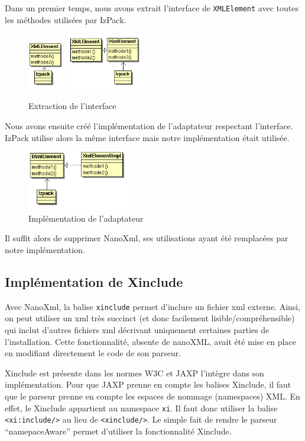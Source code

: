 Dans un premier temps, nous avons extrait l'interface de \verb|XMLElement| avec toutes les méthodes utilisées par IzPack.
\begin{figure}[H]
	\centering
	\includegraphics[width=0.15\textwidth]{../image/sol_casInitial.png}
	\hfil
	\includegraphics[width=0.3\textwidth]{../image/sol_extractionInterface.png}
	\caption{Extraction de l'interface}
\end{figure}
Nous avons ensuite créé l'implémentation de l'adaptateur respectant l'interface.
IzPack utilise alors la même interface mais notre implémentation était utilisée.
\begin{figure}[H]
	\centering
	\includegraphics[width=0.4\textwidth]{../image/sol_implementation.png}
	\caption{Implémentation de l'adaptateur}
\end{figure}
Il suffit alors de supprimer NanoXml, ses utilisations ayant été remplacées par notre implémentation.
\subsection{Implémentation de Xinclude}
Avec NanoXml, la balise \verb|xinclude| permet d'inclure un fichier xml externe.
Ainsi, on peut utiliser un xml très succinct (et donc facilement lisible/compréhensible) qui inclut d'autres fichiers xml décrivant uniquement certaines parties de l'installation.
Cette fonctionnalité, absente de nanoXML, avait été mise en place en modifiant directement le code de son parseur.

Xinclude est présente dans les normes W3C et JAXP l'intègre dans son implémentation.
Pour que JAXP prenne en compte les balises Xinclude, il faut que le parseur prenne en compte les espaces de nommage (namespaces) XML.
En effet, le Xinclude appartient au namespace \verb|xi|.
Il faut donc utiliser la balise \verb|<xi:include/>| au lieu de \verb|<xinclude/>|.
Le simple fait de rendre le parseur ``namepaceAware'' permet d'utiliser la fonctionnalité Xinclude.
